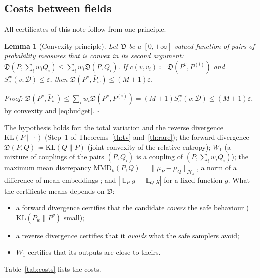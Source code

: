 \documentclass{article}
\DeclareMathOperator{\E}{\mathbb{E}}
\newcommand{\cD}{\mathcal{D}}                       %
\newcommand{\Pv}[1]{P^{#1}}                         %
\newcommand{\Pbar}{\bar{P}}                         %
\newcommand{\KL}{\mathrm{KL}}
\theoremstyle{plain}
\newtheorem{lemma}{Lemma}
\begin{document}
\subsection{Costs between fields}\label{subsec:costs}

All certificates of this note follow from one principle.

\begin{lemma}[Convexity principle]\label{lem:convexity}
Let $\mathfrak{D}$ be a $[0,+\infty]$-valued function of pairs of probability measures that is convex in its
second argument: $\mathfrak{D}(P,\sum_iw_iQ_i)\leq\sum_iw_i\mathfrak{D}(P,Q_i)$. If
$c(v,v_i)\coloneqq\mathfrak{D}(\Pv{v},P^{(i)})$ and $S^w_c(v;\cD)\leq\varepsilon$, then
$\mathfrak{D}(\Pv{v},\Pbar_w)\leq(M+1)\varepsilon$.
\end{lemma}
\textit{Proof:}
$\mathfrak{D}(\Pv{v},\Pbar_w)\leq\sum_iw_i\mathfrak{D}(\Pv{v},P^{(i)})=(M+1)S^w_c(v;\cD)\leq(M+1)\varepsilon$, by convexity
and \eqref{eq:budget}. \hfill $\square$

The hypothesis holds for: the total variation and the reverse divergence $\KL(P\|\cdot)$ (Step~1 of
Theorems~\ref{th:tv} and~\ref{th:rare}); the forward divergence $\mathfrak{D}(P,Q)\coloneqq\KL(Q\|P)$ (joint
convexity of the relative entropy); $W_1$ (a mixture of couplings of the pairs $(P,Q_i)$ is a coupling
of $(P,\sum_iw_iQ_i)$); the maximum mean discrepancy
$\mathrm{MMD}_k(P,Q)=\|\mu_P-\mu_Q\|_{\mathcal{H}_k}$, a norm of a difference of mean embeddings
\citep{gretton2012kernel}; and $|\E_Pg-\E_Qg|$ for a fixed function $g$. What the certificate means
depends on $\mathfrak{D}$:
\begin{itemize}
\item a forward divergence certifies that the candidate \emph{covers} the safe behaviour
($\KL(\Pbar_w\|\Pv{v})$ small);
\item a reverse divergence certifies that it \emph{avoids} what the safe samplers avoid;
\item $W_1$ certifies that its outputs are close to theirs.
\end{itemize}
Table~\ref{tab:costs} lists the costs.
\end{document}
